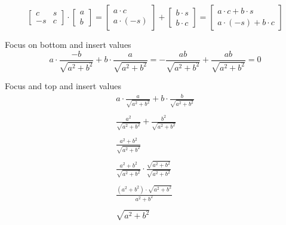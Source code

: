 \documentclass{article}
\begin{document}
\begin{equation}
    \begin{bmatrix}
        c & s \\
        -s & c
    \end{bmatrix}
    \cdot
    \begin{bmatrix}
        a \\
        b
    \end{bmatrix}
    =
    \begin{bmatrix}
        a \cdot c \\
        a \cdot (-s)
    \end{bmatrix}
    +
    \begin{bmatrix}
        b \cdot s \\
        b \cdot c
    \end{bmatrix}
    =
    \begin{bmatrix}
        a \cdot c + b \cdot s \\
        a \cdot (-s) + b \cdot c
    \end{bmatrix}
\end{equation}

Focus on bottom and insert values
\begin{equation}
    a \cdot \frac{-b}{\sqrt{ a^2 + b^2 }} + b \cdot \frac{a}{\sqrt{a^2 + b^2}}
    =
    -\frac{ab}{\sqrt{ a^2 + b^2 }} + \frac{ab}{\sqrt{a^2 + b^2}}
    =
    0
\end{equation}

Focus and top and insert values
\begin{equation}
    \begin{array}{c}
    a \cdot \frac{a}{\sqrt{ a^2 + b^2 }} + b \cdot \frac{b}{\sqrt{a^2 + b^2}} \\\\
    \frac{a^2}{\sqrt{ a^2 + b^2 }} + \frac{b^2}{\sqrt{a^2 + b^2}} \\\\
    \frac{a^2 + b^2}{\sqrt{ a^2 + b^2 }} \\\\
    \frac{a^2 + b^2 }{\sqrt{a^2 + b^2}} \cdot \frac{\sqrt{a^2 + b^2}}{\sqrt{a^2 + b^2}} \\\\
    \frac{(a^2 + b^2) \cdot \sqrt{a^2 + b^2}}{a^2 + b^2} \\\\
    \sqrt{a^2 + b^2}
    \end{array}
\end{equation}
\end{document}
